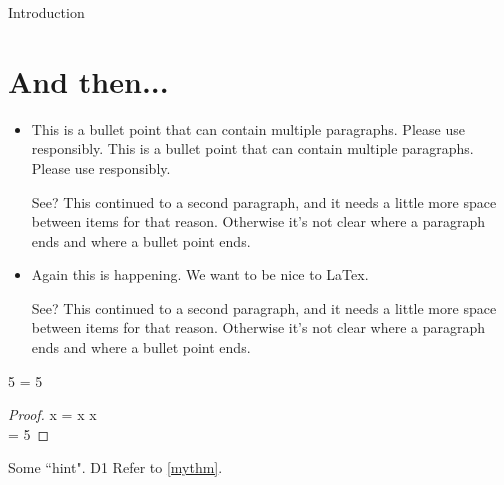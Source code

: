 \begin{MainChapter}{Introduction}
\newpage
\section{And then...}

\begin{itemize}[long]
    \item
    This is a bullet point that can contain multiple paragraphs. Please use responsibly.
    This is a bullet point that can contain multiple paragraphs. Please use responsibly.
    
    See? This continued to a second paragraph, and it needs a little more space between items for that reason. Otherwise it's not clear where a paragraph ends and where a bullet point ends.
    
    \item Again this is happening. We want to be nice to LaTex.
    
    See? This continued to a second paragraph, and it needs a little more space between items for that reason. Otherwise it's not clear where a paragraph ends and where a bullet point ends.
\end{itemize}

\begin{Theorem}[label=mythm, name=Fiveness]
5 = 5
\end{Theorem}

\begin{proof}
x = x \forall x\\
 = 5
\end{proof}

\begin{Hint}[name = An optional title., label=fives]
Some ``hint". \ac{D1}
Refer to \cref{mythm}.
\end{Hint}





\end{MainChapter}
